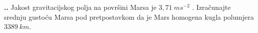 

\noindent 
\textbf{
\thecjelina.\thezadatak.}
Jakost gravitacijskog polja na površini Marsa je $3,71\ ms^{-2}$ . Izračunajte srednju gustoću
Marsa pod pretpostavkom da je Mars homogena kugla polumjera $3389\ km$.

